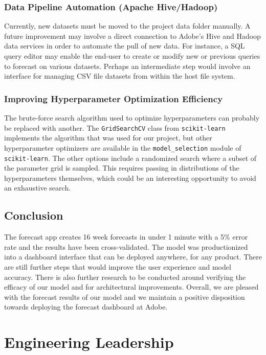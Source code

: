 \documentclass[11pt, oneside, authoryear]{report}
\begin{document}
\subsection{Data Pipeline Automation (Apache Hive/Hadoop)}
Currently, new datasets must be moved to the project data folder manually. A future improvement may involve a direct connection to Adobe's Hive and Hadoop data services in order to automate the pull of new data. For instance, a SQL query editor may enable the end-user to create or modify new or previous queries to forecast on various datasets. Perhaps an intermediate step would involve an interface for managing CSV file datasets from within the host file system.

\subsection{Improving Hyperparameter Optimization Efficiency}
\label{improving_hyperparameter_optimization_efficiency}
The brute-force search algorithm used to optimize hyperparameters can probably be replaced with another. The \texttt{GridSearchCV} class from \texttt{scikit-learn} implements the algorithm that was used for our project, but other hyperparameter optimizers are available in the \texttt{model\_selection} module of \texttt{scikit-learn}. The other options include a randomized search where a subset of the parameter grid is sampled. This requires passing in distributions of the hyperparameters themselves, which could be an interesting opportunity to avoid an exhaustive search.

\section{Conclusion}
The forecast app creates 16 week forecasts in under 1 minute with a 5\% error rate and the results have been cross-validated. The model was productionized into a dashboard interface that can be deployed anywhere, for any product. There are still further steps that would improve the user experience and model accuracy. There is also further research to be conducted around verifying the efficacy of our model and for architectural improvements. Overall, we are pleased with the forecast results of our model and we maintain a positive disposition towards deploying the forecast dashboard at Adobe.

\chapter{Engineering Leadership}
\end{document}
